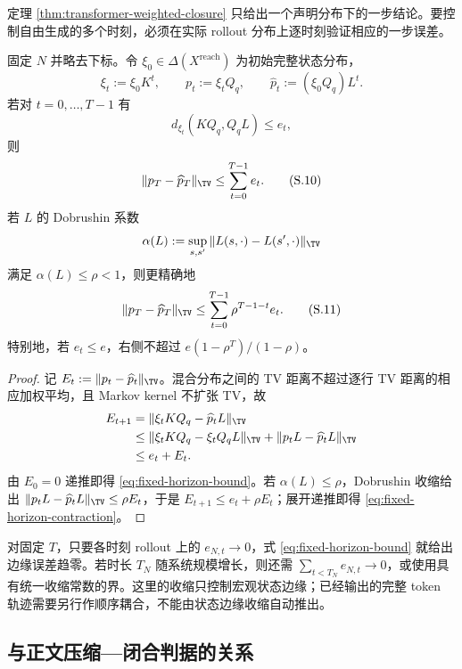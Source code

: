 定理 \ref{thm:transformer-weighted-closure} 只给出一个声明分布下的一步结论。要控制自由生成的多个时刻，必须在实际 rollout 分布上逐时刻验证相应的一步误差。

\begin{proposition}[固定时长的宏观状态边缘]
\label{prop:transformer-fixed-horizon}
固定 $N$ 并略去下标。令 $\xi_0\in\Delta(X^{\mathrm{reach}})$ 为初始完整状态分布，
\[
 \xi_t:=\xi_0K^t,
 \qquad p_t:=\xi_tQ_q,
 \qquad \widehat p_t:=(\xi_0Q_q)L^t.
\]
若对 $t=0,\ldots,T-1$ 有
\[
 d_{\xi_t}(KQ_q,Q_qL)\le e_t,
 \tag{S.9}\label{eq:rollout-one-step}
\]
则
\[
 \|p_T-\widehat p_T\|_{\TV}
 \le\sum_{t=0}^{T-1}e_t.
 \tag{S.10}\label{eq:fixed-horizon-bound}
\]
若 $L$ 的 Dobrushin 系数
\[
 \alpha(L):=\sup_{s,s'}\|L(s,\cdot)-L(s',\cdot)\|_{\TV}
\]
满足 $\alpha(L)\le\rho<1$，则更精确地
\[
 \|p_T-\widehat p_T\|_{\TV}
 \le\sum_{t=0}^{T-1}\rho^{T-1-t}e_t.
 \tag{S.11}\label{eq:fixed-horizon-contraction}
\]
特别地，若 $e_t\le e$，右侧不超过
$e(1-\rho^T)/(1-\rho)$。
\end{proposition}

\begin{proof}
记 $E_t:=\|p_t-\widehat p_t\|_{\TV}$。混合分布之间的 TV 距离不超过逐行 TV 距离的相应加权平均，且 Markov kernel 不扩张 TV，故
\[
 \begin{aligned}
 E_{t+1}
 &=\|\xi_tKQ_q-\widehat p_tL\|_{\TV}\\
 &\le\|\xi_tKQ_q-\xi_tQ_qL\|_{\TV}
     +\|p_tL-\widehat p_tL\|_{\TV}\\
 &\le e_t+E_t.
 \end{aligned}
\]
由 $E_0=0$ 递推即得 \eqref{eq:fixed-horizon-bound}。若
$\alpha(L)\le\rho$，Dobrushin 收缩给出
$\|p_tL-\widehat p_tL\|_{\TV}\le\rho E_t$，于是
$E_{t+1}\le e_t+\rho E_t$；展开递推即得
\eqref{eq:fixed-horizon-contraction}。
\end{proof}

\begin{remark}[固定时长与增长时长]
对固定 $T$，只要各时刻 rollout 上的 $e_{N,t}\to0$，式
\eqref{eq:fixed-horizon-bound} 就给出边缘误差趋零。若时长 $T_N$ 随系统规模增长，则还需
$\sum_{t<T_N}e_{N,t}\to0$，或使用具有统一收缩常数的界。这里的收缩只控制宏观状态边缘；已经输出的完整 token 轨迹需要另行作顺序耦合，不能由状态边缘收缩自动推出。
\end{remark}

\subsection{与正文压缩—闭合判据的关系}
\label{sec:transformer-gamma-relation}

